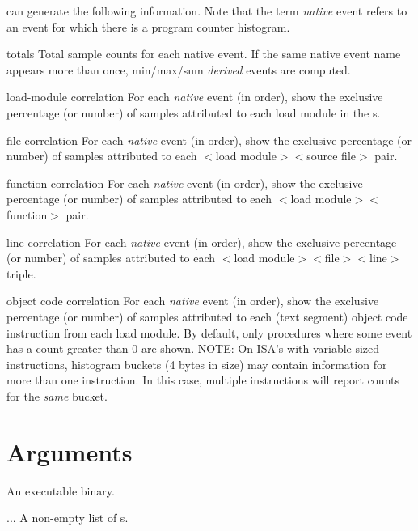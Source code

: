 \documentclass[english]{article}
\begin{document}
 can generate the following information.  Note that the term \emph{native} event refers to an event for which there is a program counter histogram.  
\begin{Description}
  \item[totals] Total sample counts for each native event.  If the same native event name appears more than once, min/max/sum \emph{derived} events are computed.
  \item[load-module correlation] For each \emph{native} event (in order), show the exclusive percentage (or number) of samples attributed to each load module in the s.
  \item[file correlation] For each \emph{native} event (in order), show the exclusive percentage (or number) of samples attributed to each $<$load module$>$$<$source file$>$ pair.
  \item[function correlation] For each \emph{native} event (in order), show the exclusive percentage (or number) of samples attributed to each $<$load module$>$$<$function$>$ pair.
  \item[line correlation] For each \emph{native} event (in order), show the exclusive percentage (or number) of samples attributed to each $<$load module$>$$<$file$>$$<$line$>$ triple.
  \item[object code correlation] For each \emph{native} event (in order), show the exclusive percentage (or number) of samples attributed to each (text segment) object code instruction from each load module.
By default, only procedures where some event has a count greater than 0 are shown.
NOTE: On ISA's with variable sized instructions, histogram buckets (4 bytes in size) may contain information for more than one instruction.  In this case, multiple instructions will report counts for the \emph{same} bucket.
\end{Description}

\section{Arguments}

\begin{Description}
\item[\Arg{binary}] An executable binary.
\item[\Arg{hpcrun-file}...] A non-empty list of s.
\end{Description}
\end{document}
